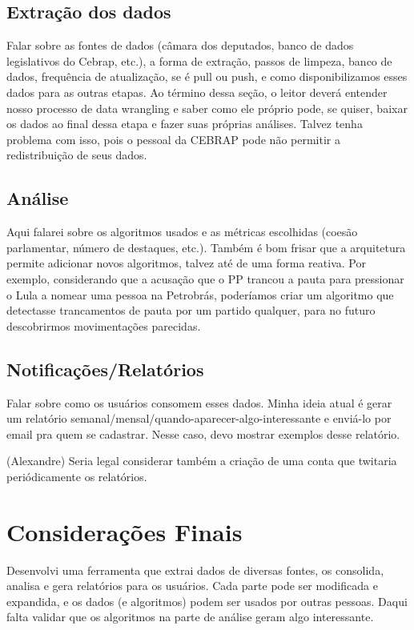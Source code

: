 \subsection{Extração dos dados}

Falar sobre as fontes de dados (câmara dos deputados, banco de dados legislativos do Cebrap, etc.), a forma de extração, passos de limpeza, banco de dados, frequência de atualização, se é pull ou push, e como disponibilizamos esses dados para as outras etapas. Ao término dessa seção, o leitor deverá entender nosso processo de data wrangling e saber como ele próprio pode, se quiser, baixar os dados ao final dessa etapa e fazer suas próprias análises. Talvez tenha problema com isso, pois o pessoal da CEBRAP pode não permitir a redistribuição de seus dados.



\subsection{Análise}

Aqui falarei sobre os algoritmos usados e as métricas escolhidas (coesão parlamentar, número de destaques, etc.). Também é bom frisar que a arquitetura permite adicionar novos algoritmos, talvez até de uma forma reativa. Por exemplo, considerando que a acusação que o PP trancou a pauta para pressionar o Lula a nomear uma pessoa na Petrobrás, poderíamos criar um algoritmo que detectasse trancamentos de pauta por um partido qualquer, para no futuro descobrirmos movimentações parecidas.

\subsection{Notificações/Relatórios}

Falar sobre como os usuários consomem esses dados. Minha ideia atual é gerar um relatório semanal/mensal/quando-aparecer-algo-interessante e enviá-lo por email pra quem se cadastrar. Nesse caso, devo mostrar exemplos desse relatório.


(Alexandre) Seria legal considerar também a criação de uma conta que twitaria periódicamente os relatórios.


\section{Considerações Finais}

Desenvolvi uma ferramenta que extrai dados de diversas fontes, os consolida, analisa e gera relatórios para os usuários. Cada parte pode ser modificada e expandida, e os dados (e algoritmos) podem ser usados por outras pessoas. Daqui falta validar que os algoritmos na parte de análise geram algo interessante.
